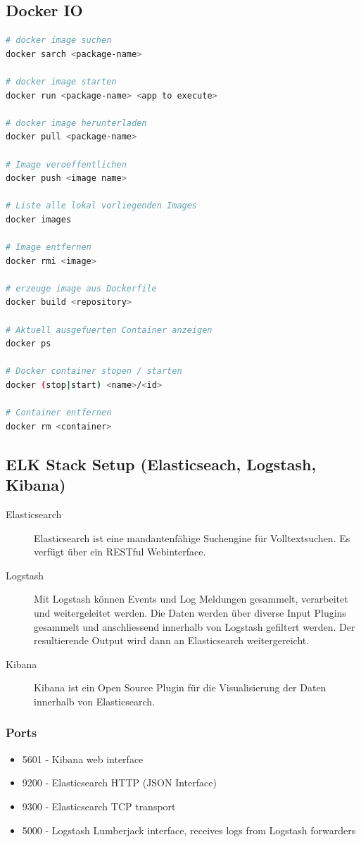 \subsection{Docker IO}
\begin{lstlisting}[language=bash]
# docker image suchen
docker sarch <package-name>

# docker image starten
docker run <package-name> <app to execute>

# docker image herunterladen
docker pull <package-name>

# Image veroeffentlichen
docker push <image name>

# Liste alle lokal vorliegenden Images
docker images

# Image entfernen
docker rmi <image>

# erzeuge image aus Dockerfile
docker build <repository>

# Aktuell ausgefuerten Container anzeigen
docker ps

# Docker container stopen / starten
docker (stop|start) <name>/<id>

# Container entfernen
docker rm <container>
\end{lstlisting}


\subsection{ELK Stack Setup (Elasticseach, Logstash, Kibana)}
\begin{description}
	\item[Elasticsearch] Elasticsearch ist eine mandantenfähige Suchengine für Volltextsuchen. Es verfügt über ein RESTful Webinterface.
	\item[Logstash] Mit Logstash können Events und Log Meldungen gesammelt, verarbeitet und weitergeleitet werden. Die Daten werden über diverse Input Plugins gesammelt und anschliessend innerhalb von Logstash gefiltert werden. Der resultierende Output wird dann an Elasticsearch weitergereicht.
	\item[Kibana] Kibana ist ein Open Source Plugin für die Visualisierung der Daten innerhalb von Elasticsearch. 
\end{description}

\subsubsection{Ports}
\begin{itemize}
	\item 5601 - Kibana web interface
	\item 9200 - Elasticsearch HTTP (JSON Interface)
	\item 9300 - Elasticsearch TCP transport
	\item 5000 - Logstash Lumberjack interface, receives logs from Logstash forwarders
\end{itemize}


